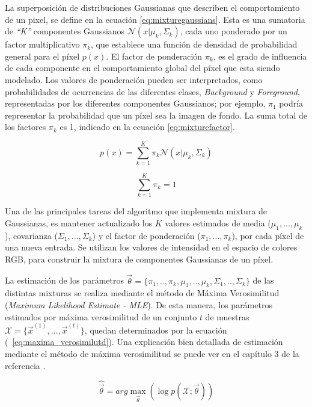 La superposición de distribuciones Gaussianas que describen el comportamiento de un pixel, se define en la ecuación \eqref{eq:mixturegaussians}. Esta es una sumatoria de \textit{``K''} componentes Gaussianos $\mathcal{N}( x | \mu_k , \Sigma_k)$, cada uno ponderado por un factor multiplicativo $\pi_k$, que establece una función de densidad de probabilidad general para el píxel $p(x)$. El factor de ponderación $\pi_k$, es el grado de influencia de cada componente en el comportamiento global del píxel que esta siendo modelado. Los valores de ponderación pueden ser interpretados, como probabilidades de ocurrencias de las diferentes clases, \textit{Background} y \textit{Foreground}, representadas por los diferentes componentes Gaussianos; por ejemplo, $\pi_1$ podría representar la probabilidad que un píxel sea la imagen de fondo. La suma total de los factores $\pi_k$ es 1, indicado en la ecuación \eqref{eq:mixturefactor}. 

\begin{equation} \label{eq:mixturegaussians}
p(x) = \sum_{k=1}^{K} \pi_k \mathcal{N}( x | \mu_k , \Sigma_k)
\end{equation}

\begin{equation} \label{eq:mixturefactor}
\sum_{k=1}^{K} \pi_k = 1
\end{equation}


Una de las principales tareas del algoritmo que implementa mixtura de Gaussianas, es mantener actualizado los $K$ valores estimados de media ($\mu_1, ..., \mu_k$),  covarianza ($\Sigma_1, ..., \Sigma_k$) y el factor de ponderación ($\pi_1, ..., \pi_k$), por cada píxel de una nueva entrada. Se utilizan los valores de intensidad en el espacio de colores RGB, para construir la mixtura de componentes Gaussianas de un píxel.

La estimación de los parámetros $\vec{\theta} = \{\pi_1,..,\pi_k, \mu_1,..,\mu_k,\Sigma_1,..,\Sigma_k \} $ de las distintas mixturas se realiza mediante el método de Máxima Verosimilitud (\textit{Maximum Likelihood Estimate - MLE}). De esta manera, los parámetros estimados por máxima verosimilitud de un conjunto $t$ de muestras $\mathcal{X} = \{\vec{x}^{(1)}, ..., \vec{x}^{(t)}\}$, quedan determinados por la ecuación (~\ref{eq:maxima_verosimilutd}). Una explicación bien detallada de estimación mediante el método de máxima verosimilitud se puede ver en el capítulo 3 de la referencia \cite{duda_pattern_2000}.

\begin{equation} \label{eq:maxima_verosimilutd}
\hat{\vec{\theta}} = arg \max_{\vec{\theta}}  (\log p(\mathcal{X};\vec{\theta}))
\end{equation}

